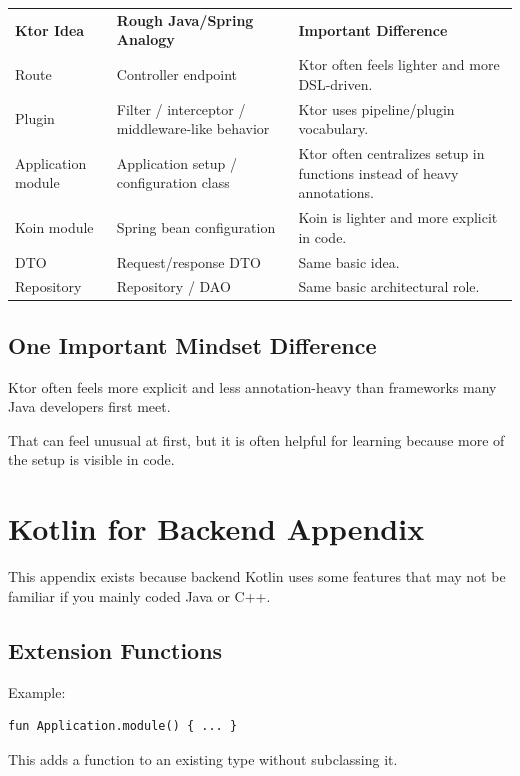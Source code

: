 \documentclass[11pt,a4paper]{article}
\begin{document}
\begin{longtable}{p{} p{} p{}}
\textbf{Ktor Idea} & \textbf{Rough Java/Spring Analogy} & \textbf{Important Difference} \\
Route & Controller endpoint & Ktor often feels lighter and more DSL-driven. \\
Plugin & Filter / interceptor / middleware-like behavior & Ktor uses pipeline/plugin vocabulary. \\
Application module & Application setup / configuration class & Ktor often centralizes setup in functions instead of heavy annotations. \\
Koin module & Spring bean configuration & Koin is lighter and more explicit in code. \\
DTO & Request/response DTO & Same basic idea. \\
Repository & Repository / DAO & Same basic architectural role. \\
\end{longtable}

\subsection{One Important Mindset Difference}

Ktor often feels more explicit and less annotation-heavy than frameworks many Java developers first meet.

That can feel unusual at first, but it is often helpful for learning because more of the setup is visible in code.

\section{Kotlin for Backend Appendix}

This appendix exists because backend Kotlin uses some features that may not be familiar if you mainly coded Java or C++.

\subsection{Extension Functions}

Example:

\begin{lstlisting}[style=kazekotlin]
fun Application.module() { ... }
\end{lstlisting}

This adds a function to an existing type without subclassing it.
\end{document}
